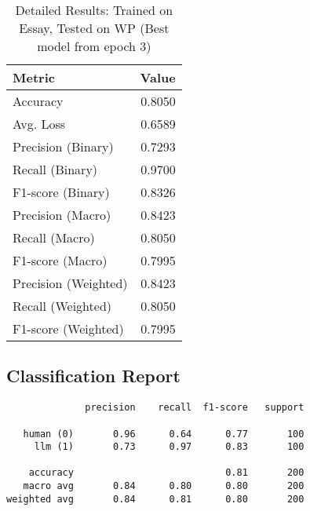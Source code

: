 \documentclass{article}
\begin{document}
\begin{table}[htbp]
\centering
\caption*{Detailed Results: Trained on Essay, Tested on WP (Best model from epoch 3)}
\begin{tabular}{@{}lr@{}}
\toprule
Metric & Value \\
\midrule
Accuracy & 0.8050 \\
Avg. Loss & 0.6589 \\
Precision (Binary) & 0.7293 \\
Recall (Binary) & 0.9700 \\
F1-score (Binary) & 0.8326 \\
Precision (Macro) & 0.8423 \\
Recall (Macro) & 0.8050 \\
F1-score (Macro) & 0.7995 \\
Precision (Weighted) & 0.8423 \\
Recall (Weighted) & 0.8050 \\
F1-score (Weighted) & 0.7995 \\
\bottomrule
\end{tabular}
\subsection*{Classification Report}
\begin{verbatim}
              precision    recall  f1-score   support

   human (0)       0.96      0.64      0.77       100
     llm (1)       0.73      0.97      0.83       100

    accuracy                           0.81       200
   macro avg       0.84      0.80      0.80       200
weighted avg       0.84      0.81      0.80       200
\end{verbatim}
\end{table}
\end{document}

